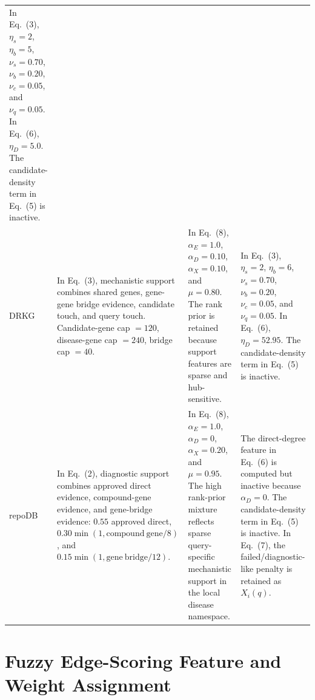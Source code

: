 \documentclass[11pt]{article}
\newcommand{\mainequation}[1]{Eq.~(#1)}
\begin{document}
\begin{longtable}{L{0.12\textwidth} *{3}{L{\tabcolsep\relax}}}
    In \mainequation{3}, \(\eta_s=2\), \(\eta_b=5\), \(\nu_s=0.70\), \(\nu_b=0.20\), \(\nu_c=0.05\), and \(\nu_q=0.05\). In \mainequation{6}, \(\eta_D=5.0\). The candidate-density term in \mainequation{5} is inactive. \\
    \addlinespace
    DRKG &
    In \mainequation{3}, mechanistic support combines shared genes, gene-gene bridge evidence, candidate touch, and query touch. Candidate-gene cap \(=120\), disease-gene cap \(=240\), bridge cap \(=40\). &
    In \mainequation{8}, \(\alpha_E=1.0\), \(\alpha_D=0.10\), \(\alpha_X=0.10\), and \(\mu=0.80\). The rank prior is retained because support features are sparse and hub-sensitive. &
    In \mainequation{3}, \(\eta_s=2\), \(\eta_b=6\), \(\nu_s=0.70\), \(\nu_b=0.20\), \(\nu_c=0.05\), and \(\nu_q=0.05\). In \mainequation{6}, \(\eta_D=52.95\). The candidate-density term in \mainequation{5} is inactive. \\
    \addlinespace
    repoDB &
    In \mainequation{2}, diagnostic support combines approved direct evidence, compound-gene evidence, and gene-bridge evidence:
    \(0.55\) approved direct, \(0.30\min(1,\mathrm{compound\ gene}/8)\), and \(0.15\min(1,\mathrm{gene\ bridge}/12)\). &
    In \mainequation{8}, \(\alpha_E=1.0\), \(\alpha_D=0\), \(\alpha_X=0.20\), and \(\mu=0.95\). The high rank-prior mixture reflects sparse query-specific mechanistic support in the local disease namespace. &
    The direct-degree feature in \mainequation{6} is computed but inactive because \(\alpha_D=0\). The candidate-density term in \mainequation{5} is inactive. In \mainequation{7}, the failed/diagnostic-like penalty is retained as \(X_i(q)\). \\
    \end{longtable}
    \endgroup
    \FloatBarrier

    \section{Fuzzy Edge-Scoring Feature and Weight Assignment}
\end{document}
